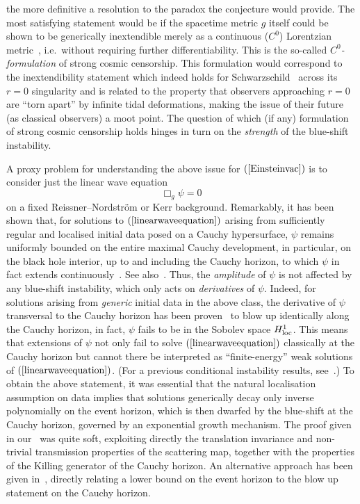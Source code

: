 \documentclass[A4,10pt]{article}
\begin{document}
the more definitive a resolution to the paradox the conjecture would provide.
The most satisfying statement would be if  the  spacetime metric $g$
itself could be shown to
be  generically inextendible merely as a continuous ($C^0$) Lorentzian
metric~\cite{Chrmil},
i.e.~without requiring further differentiability. This is the so-called
\emph{$C^0$-formulation} of strong cosmic censorship.
This formulation would correspond to the inextendibility statement which
indeed holds for Schwarzschild~\cite{SbierskiCzero} across its $r=0$ singularity
and
 is related to the property that  observers approaching $r=0$ 
 are ``torn apart'' by infinite tidal deformations, 
making the issue of  their future (as classical observers)
a moot point.
 The question of which (if any)  formulation of strong cosmic censorship holds hinges in turn  
on the \emph{strength} of the blue-shift instability.




A proxy problem for understanding the above issue for $(\ref{Einsteinvac})$ is 
to consider just the linear wave equation
\begin{equation}
\label{linearwaveequation}
\Box_g\psi=0
\end{equation}
on a fixed Reissner--Nordstr\"om or Kerr background.
Remarkably, it has been shown that, for solutions to $(\ref{linearwaveequation})$ arising from
sufficiently regular and localised initial data posed on a Cauchy hypersurface,
$\psi$ remains uniformly bounded on the entire maximal Cauchy development, in particular, on
the  black hole interior, up to and including the Cauchy horizon,
to which $\psi$ in fact extends continuously~\cite{annefranzen, Franzen2}.  
See also~\cite{Hintz:2015koq}.
Thus,  the \emph{amplitude} of $\psi$ is not affected by any blue-shift instability,
which only acts on \emph{derivatives} of $\psi$.
Indeed, for solutions arising from
\emph{generic} initial data in the above class, the  derivative of $\psi$ transversal 
to the Cauchy horizon has been proven~\cite{LukOhpub, DafShlap} to blow up identically
along the Cauchy horizon, in fact, $\psi$ fails to be in 
the Sobolev space $H^1_{\rm loc}$. This  means that extensions
of $\psi$ not only fail to solve $(\ref{linearwaveequation})$ classically
at the Cauchy horizon
 but cannot there
 be interpreted as ``finite-energy'' weak solutions of $(\ref{linearwaveequation})$.
 (For a previous conditional instability results, see~\cite{mcnamara1978instability, D2}.)
To obtain the above statement, it was essential 
 that the natural localisation assumption on data implies that solutions generically
 decay only inverse polynomially on the event horizon, which is then
dwarfed by  the
blue-shift at the Cauchy horizon, governed by an exponential growth mechanism. 
The proof given in our~\cite{DafShlap} was quite soft, exploiting  directly
the translation invariance and non-trivial transmission properties of the scattering
map, together with the properties of the Killing  generator of the 
Cauchy horizon.  An alternative approach has been given in~\cite{LukSbierski}, directly relating a lower bound on the event horizon to the blow up statement on the Cauchy horizon. 
\end{document}
